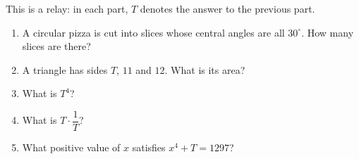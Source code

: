 This is a relay: in each part, $T$ denotes the answer to the previous part.
\begin{enumerate}
\item A circular pizza is cut into slices whose central angles are all $30^\circ$. How many slices are there?
\item A triangle has sides $T$, $11$ and $12$. What is its area?
\item What is $T^4$?
\item What is $T\cdot\dfrac{1}{T}$?
\item What positive value of $x$ satisfies $x^4+T=1297$?
\end{enumerate}
